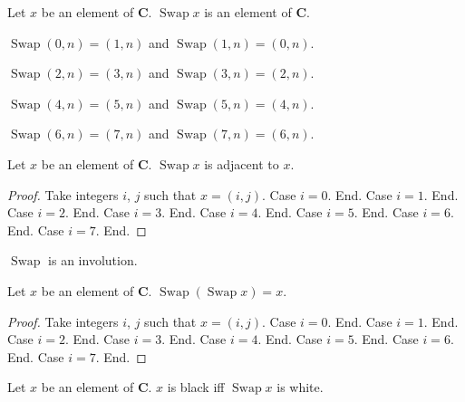 \documentclass{article}
\newcommand{\Checkerboard}{\mathbf{C}}
\newcommand{\Swap}[1]{\operatorname{Swap}#1}
\begin{document}
\begin{forthel}
    \begin{signature}
        Let $x$ be an element of $\Checkerboard$.
        $\Swap{x}$ is an element of $\Checkerboard$.
    \end{signature}

    \begin{axiom} $\Swap{(0, n)} = (1, n)$ and $\Swap{(1, n)} = (0, n)$. \end{axiom}

    \begin{axiom} $\Swap{(2, n)} = (3, n)$ and $\Swap{(3, n)} = (2, n)$. \end{axiom}

    \begin{axiom} $\Swap{(4, n)} = (5, n)$ and $\Swap{(5, n)} = (4, n)$. \end{axiom}

    \begin{axiom} $\Swap{(6, n)} = (7, n)$ and $\Swap{(7, n)} = (6, n)$. \end{axiom}

    \begin{lemma}
        Let $x$ be an element of $\Checkerboard$.
        $\Swap{x}$ is adjacent to $x$.
    \end{lemma}
    \begin{proof}
        Take integers $i$, $j$ such that $x = (i, j)$.
        Case $i = 0$. End.
        Case $i = 1$. End.
        Case $i = 2$. End.
        Case $i = 3$. End.
        Case $i = 4$. End.
        Case $i = 5$. End.
        Case $i = 6$. End.
        Case $i = 7$. End.
    \end{proof}
\end{forthel}

$\Swap{}$ is an involution.

\begin{forthel}
    \begin{lemma}
        Let $x$ be an element of $\Checkerboard$.
        $\Swap{(\Swap{x})} = x$.
    \end{lemma}
    \begin{proof}
        Take integers $i$, $j$ such that $x = (i, j)$.
        Case $i = 0$. End.
        Case $i = 1$. End.
        Case $i = 2$. End.
        Case $i = 3$. End.
        Case $i = 4$. End.
        Case $i = 5$. End.
        Case $i = 6$. End.
        Case $i = 7$. End.
    \end{proof}

    \begin{lemma}
        Let $x$ be an element of $\Checkerboard$.
        $x$ is black iff $\Swap{x}$ is white.
    \end{lemma}
\end{forthel}
\end{document}
